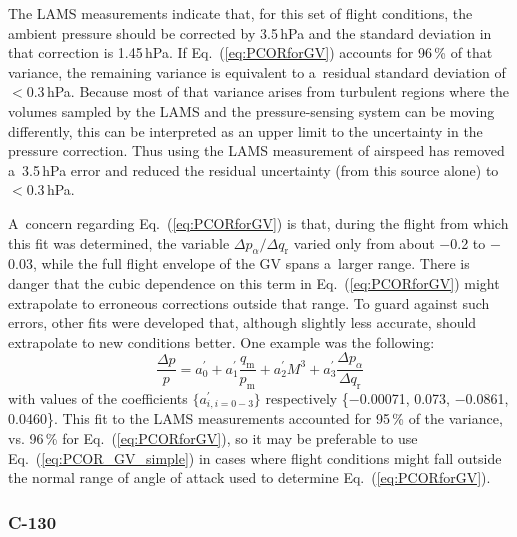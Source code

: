 \documentclass[amtd, online, hvmath]{copernicus}
\begin{document}
The LAMS measurements indicate that, for this set of flight
conditions, the ambient pressure should be corrected by 3.5\,hPa and
the standard deviation in that correction is 1.45\,hPa. If
Eq.~(\ref{eq:PCORforGV}) accounts for 96\,{\%} of that variance, the
remaining variance is equivalent to a~residual standard deviation of
$<0.3$\,hPa. Because most of that variance arises from turbulent regions
where the volumes sampled by the LAMS and the pressure-sensing system
can be moving differently, this can be interpreted as an upper limit
to the uncertainty in the pressure correction. Thus using the LAMS
measurement of airspeed has removed a~3.5\,hPa error and reduced the
residual uncertainty (from this source alone) to $<0.3$\,hPa.

A~concern regarding Eq.~(\ref{eq:PCORforGV}) is that, during the
flight from which this fit was determined, the variable $\Delta
p_{\alpha}/\Delta q_{\mathrm{r}}$ varied only from about $-$0.2 to
$-$0.03, while the full flight envelope of the GV spans a~larger
range. There is danger that the cubic dependence on this term in
Eq.~(\ref{eq:PCORforGV}) might extrapolate to erroneous corrections
outside that range. To guard against such errors, other fits were
developed that, although slightly less accurate, should extrapolate to
new conditions better. One example was the following:
\begin{equation}
\frac{\Delta p}{p}=a_0^{\prime}+a_1^{\prime}\frac{q_{\mathrm{m}}}{p_{\mathrm{m}}}+a_2^{\prime}M^3+a_3^{\prime}\frac{\Delta p_{\alpha}}{\Delta q_{\mathrm{r}}}\label{eq:PCOR_GV_simple}
\end{equation}
with values of the coefficients $\{a_{i, i=0-3}^{\prime}\}$
respectively \{$-$0.00071, 0.073, $-$0.0861, 0.0460\}. This fit to the
LAMS measurements accounted for 95\,{\%} of the variance, vs. 96\,{\%}
for Eq.~(\ref{eq:PCORforGV}), so it may be preferable to use
Eq.~(\ref{eq:PCOR_GV_simple}) in cases where flight conditions might
fall outside the normal range of angle of attack used to determine
Eq.~(\ref{eq:PCORforGV}).

\subsubsection{C-130}
\end{document}
